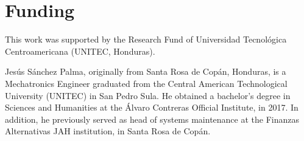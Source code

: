 \documentclass{ieeeaccess}
\begin{document}
\section{Funding}

This work was supported by the Research Fund of Universidad Tecnológica Centroamericana (UNITEC, Honduras).

 


\begin{IEEEbiography}{Jesús Sánchez Palma}, originally from Santa Rosa de Copán, Honduras, is a Mechatronics Engineer graduated from the Central American Technological University (UNITEC) in San Pedro Sula. He obtained a bachelor's degree in Sciences and Humanities at the Álvaro Contreras Official Institute, in 2017. In addition, he previously served as head of systems maintenance at the Finanzas Alternativas JAH institution, in Santa Rosa de Copán.
\end{IEEEbiography}
\end{document}
